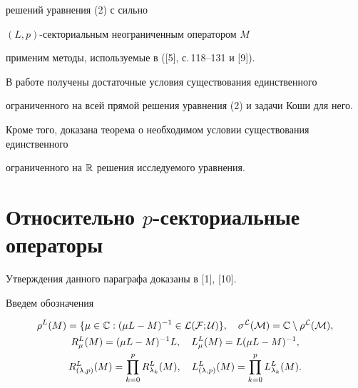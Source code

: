решений уравнения (2) с сильно


$(L,p)$-секториальным неограниченным оператором $M$


применим методы, используемые в ([5], с.\,118--131 и [9]).


В работе получены достаточные условия существования единственного 


ограниченного на всей прямой решения уравнения (2) и задачи Коши для него. 


Кроме того, доказана теорема о необходимом условии существования единственного


ограниченного на ${\Bbb R}$ решения исследуемого уравнения.








\section{Относительно $p$-секториальные операторы}





Утверждения данного параграфа доказаны в [1], [10].





Введем обозначения


\begin{gather*}


\rho^L(M)=\{\mu\in{\Bbb C}:(\mu L-M)^{-1}


\in\cal L(\cal F;\cal U)\},\quad


\sigma^L(M)={\Bbb C}\setminus\rho^L(M), \\


%


R_{\mu}^L(M)=(\mu L-M)^{-1}L,\quad L_{\mu }^L(M)=L(\mu L-M)^{-1}, \\


%


R_{(\lambda ,p)}^L(M)=\prod


\limits_{k=0}^pR_{\lambda _k}^L(M),\quad


L_{(\lambda ,p)}^L(M)=\prod\limits_{k=0}^pL_{\lambda _k}^L(M).


\end{gather*}








